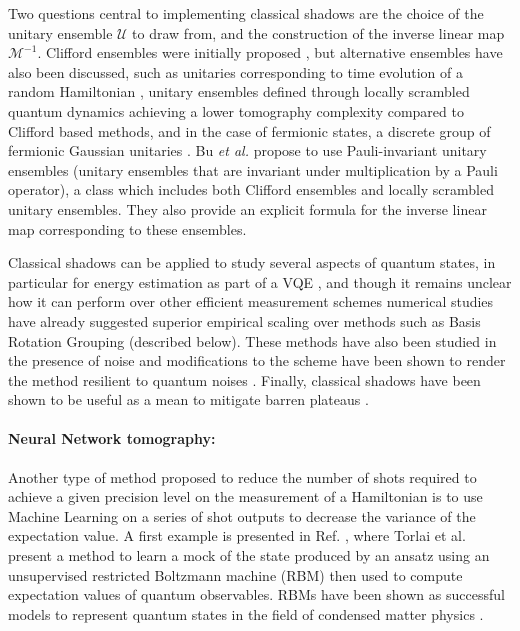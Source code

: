 Two questions central to implementing classical shadows are the choice of the unitary ensemble $\mathcal{U}$ to draw from, and the construction of the inverse linear map $\mathcal{M}^{-1}$. Clifford ensembles were initially proposed \cite{Huang2020}, but alternative ensembles have also been discussed, such as unitaries corresponding to time evolution of a random Hamiltonian \cite{Hu2022}, unitary ensembles defined through locally scrambled quantum dynamics \cite{Hu2021} achieving a lower tomography complexity compared to Clifford based methods, and in the case of fermionic states, a discrete group of fermionic Gaussian unitaries \cite{Zhao2021, OBrien2021}. Bu \textit{et al.} \cite{Bu2022} propose to use Pauli-invariant unitary ensembles (unitary ensembles that are invariant under multiplication by a Pauli operator), a class which includes both Clifford ensembles and locally scrambled unitary ensembles. They also provide an explicit formula for the inverse linear map corresponding to these ensembles.

Classical shadows can be applied to study several aspects of quantum states, in particular for energy estimation as part of a VQE \cite{Hadfield2020, Hadfield2021, OBrien2021, Lukens2021}, and though it remains unclear how it can perform over other efficient measurement schemes numerical studies have already suggested superior empirical scaling over methods such as Basis Rotation Grouping \cite{Huggins2021} (described below).
These methods have also been studied in the presence of noise and modifications to the scheme have been shown to render the method resilient to quantum noises \cite{Chen2021_shadow, Koh2020}. Finally, classical shadows have been shown to be useful as a mean to mitigate barren plateaus \cite{Sack2022}. 

\paragraph{Neural Network tomography:} Another type of method proposed to reduce the number of shots required to achieve a given precision level on the measurement of a Hamiltonian is to use Machine Learning on a series of shot outputs to decrease the variance of the expectation value.     
A first example is presented in Ref. \cite{Torlai2020}, where Torlai et al. present a method to learn a mock of the state produced by an ansatz using an unsupervised restricted Boltzmann machine (RBM) \cite{Ackley1985} then used to compute expectation values of quantum observables. RBMs have been shown as successful models to represent quantum states in the field of condensed matter physics \cite{Melko2019, Torlai2020_MLQS}. 

